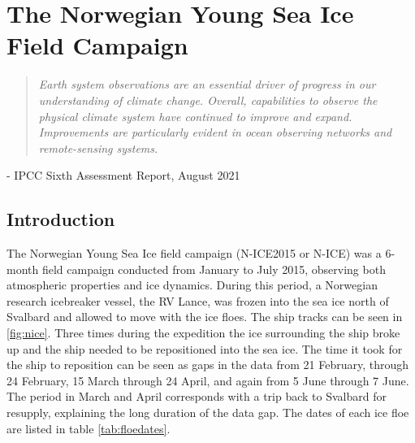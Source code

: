\chapter{The Norwegian Young Sea Ice Field Campaign}
\vspace{1 cm}
\begin{spacing}{1} \begin{quote} 
\noindent \emph{Earth system observations are an essential driver of progress in our understanding of climate change. Overall, capabilities to observe the physical climate system have continued to improve and expand. Improvements are particularly evident in ocean observing networks and remote-sensing systems.} \end{quote}
\hspace{6 cm} - IPCC Sixth Assessment Report, August 2021  
\end{spacing}
\doublespacing
\section{Introduction}
The Norwegian Young Sea Ice field campaign (N-ICE2015 or N-ICE) was a 6-month field campaign conducted from January to July 2015, observing both atmospheric properties and ice dynamics. During this period, a Norwegian research icebreaker vessel, the RV Lance, was frozen into the sea ice north of Svalbard and allowed to move with the ice floes. The ship tracks can be seen in \ref{fig:nice}. Three times during the expedition the ice surrounding the ship broke up and the ship needed to be repositioned into the sea ice. The time it took for the ship to reposition can be seen as gaps in the data from 21 February, through 24 February, 15 March through 24 April, and again from 5 June through 7 June. The period in March and April corresponds with a trip back to Svalbard for resupply, explaining the long duration of the data gap. The dates of each ice floe are listed in table \ref{tab:floedates}. 

